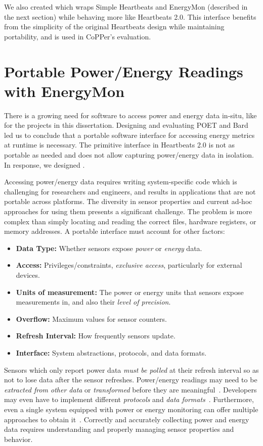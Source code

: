 We also created  which wraps Simple Heartbeats and EnergyMon (described in the next section) while behaving more like Heartbeats 2.0.
This interface benefits from the simplicity of the original Heartbeats design while maintaining portability, and is used in CoPPer's evaluation.


\section{Portable Power/Energy Readings with EnergyMon}
\label{app:energymon}

There is a growing need for software to access power and energy data in-situ, like for the projects in this dissertation.
Designing and evaluating POET and Bard led us to conclude that a portable software interface for accessing energy metrics at runtime is necessary.
The primitive interface in Heartbeats 2.0 is not as portable as needed and does not allow capturing power/energy data in isolation.
In response, we designed .

Accessing power/energy data requires writing system-specific code which is challenging for researchers and engineers, and results in applications that are not portable across platforms.
The diversity in sensor properties and current ad-hoc approaches for using them presents a significant challenge.
The problem is more complex than simply locating and reading the correct files, hardware registers, or memory addresses.
A portable interface must account for other factors:
\begin{itemize}
\item \textbf{Data Type:} Whether sensors expose \emph{power} or \emph{energy} data.
\item \textbf{Access:} Privileges/constraints, \eg \emph{exclusive access}, particularly for external devices.
\item \textbf{Units of measurement:} The power or energy units that sensors expose measurements in, and also their \emph{level of precision}.
\item \textbf{Overflow:} Maximum values for sensor counters.
\item \textbf{Refresh Interval:} How frequently sensors update.
\item \textbf{Interface:} System abstractions, protocols, and data formats.
\end{itemize}
Sensors which only report power data \emph{must be polled} at their refresh interval so as not to lose data after the sensor refreshes.
Power/energy readings may need to be \emph{extracted from other data} or \emph{transformed} before they are meaningful~\cite{WattsUp,OSP,SandyBridge}.
Developers may even have to implement different \emph{protocols} and \emph{data formats}~\cite{WattsUp,OSP}.
Furthermore, even a single system equipped with power or energy monitoring can offer multiple approaches to obtain it~\cite{RAPL,ina231,SandyBridge}.
Correctly and accurately collecting power and energy data requires understanding and properly managing sensor properties and behavior.

